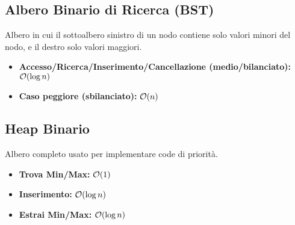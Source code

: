 \subsection*{Albero Binario di Ricerca (BST)}
Albero in cui il sottoalbero sinistro di un nodo contiene solo valori minori del nodo, e il destro solo valori maggiori.
\begin{itemize}
    \item \textbf{Accesso/Ricerca/Inserimento/Cancellazione (medio/bilanciato):} $\mathcal{O}(\log n)$
    \item \textbf{Caso peggiore (sbilanciato):} $\mathcal{O}(n)$
\end{itemize}

\subsection*{Heap Binario}
Albero completo usato per implementare code di priorità.
\begin{itemize}
    \item \textbf{Trova Min/Max:} $\mathcal{O}(1)$
    \item \textbf{Inserimento:} $\mathcal{O}(\log n)$
    \item \textbf{Estrai Min/Max:} $\mathcal{O}(\log n)$
\end{itemize}